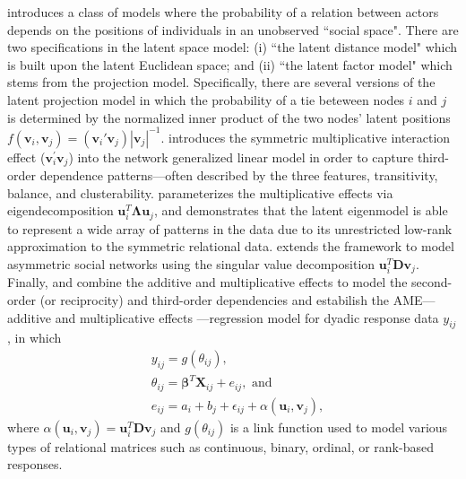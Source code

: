 \documentclass[a4paper]{article}
\begin{document}
 \cite{hoff2002latent} introduces a class of models where the probability of a relation between actors depends on the positions of individuals in an unobserved ``social space". There are two specifications in the latent space model: (i) ``the latent distance model" which is built upon the latent Euclidean space; and (ii) ``the latent factor model" which stems from the projection model. Specifically, there are several versions of the latent projection model in which the probability of a tie beteween nodes $i$ and $j$ is determined by the normalized inner product of the two nodes' latent positions $f(\boldsymbol{v}_i, \boldsymbol{v}_j)={(\boldsymbol{v}_i'\boldsymbol{v}_j)}{|\boldsymbol{v}_j|^{-1}}$. \cite{hoff2005bilinear} introduces the symmetric multiplicative interaction effect ($\boldsymbol{v}_i^\prime \boldsymbol{v}_j$) into the network generalized linear model in order to capture third-order dependence patterns---often described by the three features, transitivity, balance, and clusterability. \cite{hoff2008modeling} parameterizes the multiplicative effects via eigendecomposition $\boldsymbol{u}_i^T\mathbf{\Lambda}\boldsymbol{u}_j$, and demonstrates that the latent eigenmodel is able to represent a wide array of patterns in the data due to its unrestricted low-rank approximation to the symmetric relational data. \cite{hoff2009multiplicative} extends the framework to model asymmetric social networks using the singular value decomposition $\boldsymbol{u}_i^T\mathbf{D}\boldsymbol{v}_j$. Finally, \cite{hoff2014amen} and \cite{minhas2016inferential} combine the additive and multiplicative effects to model the second-order (or reciprocity) and third-order dependencies and estabilish the AME---additive and multiplicative effects ---regression model for dyadic response data $y_{ij}$, in which 
	\begin{equation}\label{AME}
		\begin{aligned}
			&y_{ij} = g(\theta_{ij}),\\
			& \theta_{ij} = \boldsymbol{\beta}^T\mathbf{X}_{ij} + e_{ij}, \mbox{ and }\\
			& e_{ij} = a_i + b_j + \epsilon_{ij} + \alpha(\boldsymbol{u}_i, \boldsymbol{v}_j), 
		\end{aligned}
	\end{equation}
where $\alpha(\boldsymbol{u}_i, \boldsymbol{v}_j) = \boldsymbol{u}_i^T\mathbf{D}\boldsymbol{v}_j$ and $ g(\theta_{ij})$ is a link function used to model various types of relational matrices such as continuous, binary, ordinal, or rank-based responses.\\ \newline
\end{document}
